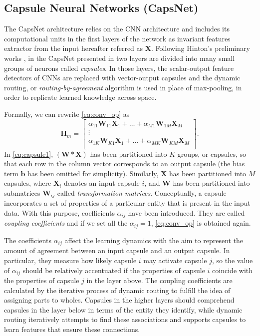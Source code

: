\subsection{Capsule Neural Networks (CapsNet)}

The CapsNet architecture relies on the CNN architecture and includes its computational units in the first layers of the network as invariant features extractor from the input hereafter referred as $\mathbf{X}$.
Following Hinton's preliminary works \cite{hinton2011transforming}, in the CapsNet presented in \cite{sabour2017dynamic} two layers are divided into many small groups of neurons called \textit{capsules}. In those layers, the scalar-output feature detectors of CNNs are replaced with vector-output capsules and the dynamic routing, or \textit{routing-by-agreement} algorithm is used in place of max-pooling, in order to replicate learned knowledge across space. 

Formally, we can rewrite \eqref{eq:conv_op} as
\begin{equation}
\label{eq:capsule1}
\mathbf{H}_{m}=
\begin{bmatrix} 
\alpha_{11}\mathbf{W}_{11}\mathbf{X}_1 + \ldots + 	\alpha_{M1}\mathbf{W}_{1M}\mathbf{X}_M   \\
\vdots  \\
\alpha_{1K} \mathbf{W}_{K1}\mathbf{X}_1 + \ldots + 	\alpha_{MK} \mathbf{W}_{KM}\mathbf{X}_M   \\
\end{bmatrix} .
\end{equation}
In \eqref{eq:capsule1}, $\left (\mathbf{W} \ast \mathbf{X} \right )$ has been partitioned into $K$ groups, or capsules, so that each row in the column vector corresponds to an output capsule (the bias term $\mathbf{b}$ has been omitted for simplicity).
Similarly, $\mathbf{X}$ has been partitioned into $M$ capsules, where $\mathbf{X}_i$ denotes an input capsule $i$, and  $\mathbf{W}$ has been partitioned into submatrices $\mathbf{W}_{ij}$ called \textit{transformation matrices}. Conceptually, a capsule incorporates a set of properties of a particular entity that is present in the input data. With this purpose, coefficients 
$\alpha_{ij}$ have been introduced. They are called \textit{coupling coefficients} and if we set all the $\alpha_{ij} = 1$, \eqref{eq:conv_op} is obtained again.

The coefficients $\alpha_{ij}$ affect the learning dynamics with the aim to represent the amount of agreement between an input capsule and an output capsule. In particular, they measure how likely capsule $i$ may activate capsule $j$, so the value of $\alpha_{ij}$ should be relatively accentuated if the properties of capsule $i$ coincide with the properties of capsule $j$ in the layer above.
The coupling coefficients are calculated by the iterative process of dynamic routing to fulfill the idea of assigning parts to wholes. 
Capsules in the higher layers should comprehend capsules in the layer below in terms of the entity they identify, while dynamic routing iteratively attempts to find these associations and supports capsules to learn features that ensure these connections.

